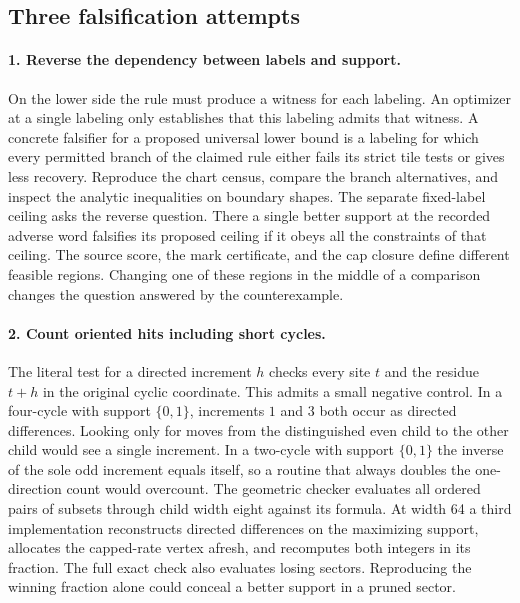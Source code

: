 \subsection{Three falsification attempts}

\paragraph{1. Reverse the dependency between labels and support.}
On the lower side the rule must produce a witness for each labeling. An optimizer at a single labeling only establishes that this labeling admits that witness. A concrete falsifier for a proposed universal lower bound is a labeling for which every permitted branch of the claimed rule either fails its strict tile tests or gives less recovery. Reproduce the chart census, compare the branch alternatives, and inspect the analytic inequalities on boundary shapes. The separate fixed-label ceiling asks the reverse question. There a single better support at the recorded adverse word falsifies its proposed ceiling if it obeys all the constraints of that ceiling. The source score, the mark certificate, and the cap closure define different feasible regions. Changing one of these regions in the middle of a comparison changes the question answered by the counterexample.

\paragraph{2. Count oriented hits including short cycles.}
The literal test for a directed increment \(h\) checks every site \(t\) and the residue \(t+h\) in the original cyclic coordinate. This admits a small negative control. In a four-cycle with support \(\{0,1\}\), increments \(1\) and \(3\) both occur as directed differences. Looking only for moves from the distinguished even child to the other child would see a single increment. In a two-cycle with support \(\{0,1\}\) the inverse of the sole odd increment equals itself, so a routine that always doubles the one-direction count would overcount. The geometric checker evaluates all ordered pairs of subsets through child width eight against its formula. At width 64 a third implementation reconstructs directed differences on the maximizing support, allocates the capped-rate vertex afresh, and recomputes both integers in its fraction. The full exact check also evaluates losing sectors. Reproducing the winning fraction alone could conceal a better support in a pruned sector.

